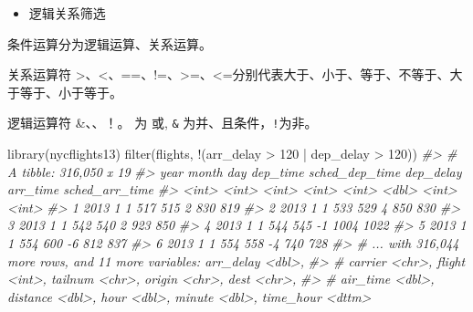 \documentclass[
]{book}
\newenvironment{Shaded}{\begin{snugshade}}{\end{snugshade}}
\newcommand{\CommentTok}[1]{\textcolor[rgb]{0.56,0.35,0.01}{\textit{#1}}}
\newcommand{\DecValTok}[1]{\textcolor[rgb]{0.00,0.00,0.81}{#1}}
\newcommand{\FunctionTok}[1]{\textcolor[rgb]{0.00,0.00,0.00}{#1}}
\newcommand{\NormalTok}[1]{#1}
\newcommand{\SpecialCharTok}[1]{\textcolor[rgb]{0.00,0.00,0.00}{#1}}
\providecommand{\tightlist}{%
  \setlength{\itemsep}{0pt}\setlength{\parskip}{0pt}}
\begin{document}
\begin{itemize}
\tightlist
\item
  逻辑关系筛选
\end{itemize}

条件运算分为逻辑运算、关系运算。

关系运算符 \textgreater、\textless、==、!=、\textgreater=、\textless=分别代表大于、小于、等于、不等于、大于等于、小于等于。

逻辑运算符 \&、\textbar、！。 \texttt{\textbar{}}为 或, \texttt{\&} 为并、且条件，\texttt{!}为非。

\begin{Shaded}
\begin{Highlighting}[]
\FunctionTok{library}\NormalTok{(nycflights13)}
\FunctionTok{filter}\NormalTok{(flights, }\SpecialCharTok{!}\NormalTok{(arr\_delay }\SpecialCharTok{\textgreater{}} \DecValTok{120} \SpecialCharTok{|}\NormalTok{ dep\_delay }\SpecialCharTok{\textgreater{}} \DecValTok{120}\NormalTok{))}
\CommentTok{\#\textgreater{} \# A tibble: 316,050 x 19}
\CommentTok{\#\textgreater{}    year month   day dep\_time sched\_dep\_time dep\_delay arr\_time sched\_arr\_time}
\CommentTok{\#\textgreater{}   \textless{}int\textgreater{} \textless{}int\textgreater{} \textless{}int\textgreater{}    \textless{}int\textgreater{}          \textless{}int\textgreater{}     \textless{}dbl\textgreater{}    \textless{}int\textgreater{}          \textless{}int\textgreater{}}
\CommentTok{\#\textgreater{} 1  2013     1     1      517            515         2      830            819}
\CommentTok{\#\textgreater{} 2  2013     1     1      533            529         4      850            830}
\CommentTok{\#\textgreater{} 3  2013     1     1      542            540         2      923            850}
\CommentTok{\#\textgreater{} 4  2013     1     1      544            545        {-}1     1004           1022}
\CommentTok{\#\textgreater{} 5  2013     1     1      554            600        {-}6      812            837}
\CommentTok{\#\textgreater{} 6  2013     1     1      554            558        {-}4      740            728}
\CommentTok{\#\textgreater{} \# ... with 316,044 more rows, and 11 more variables: arr\_delay \textless{}dbl\textgreater{},}
\CommentTok{\#\textgreater{} \#   carrier \textless{}chr\textgreater{}, flight \textless{}int\textgreater{}, tailnum \textless{}chr\textgreater{}, origin \textless{}chr\textgreater{}, dest \textless{}chr\textgreater{},}
\CommentTok{\#\textgreater{} \#   air\_time \textless{}dbl\textgreater{}, distance \textless{}dbl\textgreater{}, hour \textless{}dbl\textgreater{}, minute \textless{}dbl\textgreater{}, time\_hour \textless{}dttm\textgreater{}}

\end{Highlighting}
\end{Shaded}
\end{document}
